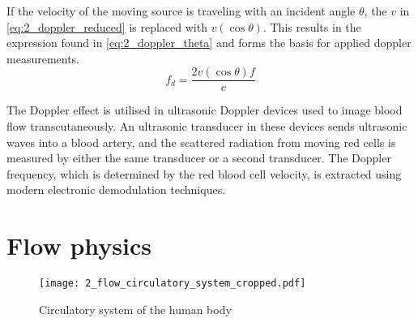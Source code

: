 If the velocity of the moving source is traveling with an incident angle $\theta$, the $v$ in \cref{eq:2_doppler_reduced} is replaced with $v (\cos\theta)$. This results in the expression found in \cref{eq:2_doppler_theta} and forms the basis for applied \gls{doppler} measurements.
\begin{equation} \label{eq:2_doppler_theta}
	f_{d} = \frac{2 v(\cos\theta) f}{c}
\end{equation}

The Doppler effect is utilised in ultrasonic Doppler devices used to image blood flow \gls{transcutaneous}ly. An ultrasonic transducer in these devices sends ultrasonic waves into a blood artery, and the scattered radiation from moving red cells is measured by either the same transducer or a second transducer. The Doppler frequency, which is determined by the red blood cell velocity, is extracted using modern electronic demodulation techniques.

\section{Flow physics}
\begin{figure}[ht!]
	\centering
	\texttt{[image: 2\_flow\_circulatory\_system\_cropped.pdf]}
	\caption[Circulatory system of the human body]{Circulatory system of the human body \cite{JensenUltrasoundBook}}
	\label{fig:2_circulatory_system}
\end{figure}

